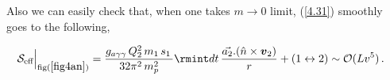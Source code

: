 \begin{itemize}
Also we can easily check that, when one takes $m\rightarrow 0$ limit, (\ref{4.31}) smoothly goes to the following, 

\begin{align}
    \begin{split}
          \mathcal{S}_{\text{eff}}\Big|_{\text{fig}(\ref{fig4an})}&
        = \frac{ g_{a\gamma\gamma}\,Q_2^2\,m_1\,s_1\,}{32\pi^2\,m_p^2}\rmint dt\,\frac{\Vec{a_2}.(\hat{n}\times\boldsymbol{v}_2)}{r}+(1\leftrightarrow2)\sim \mathcal{O}(Lv^5)\,.
    \end{split}
\end{align}
\par 



\end{itemize}
